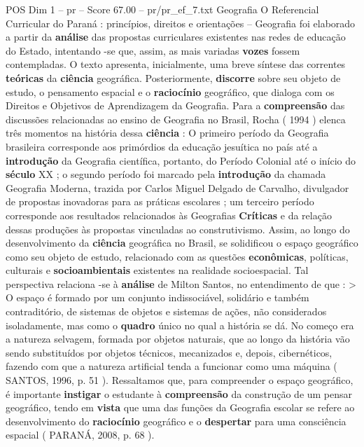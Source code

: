 \begin{textsample}{POS Dim 1 – pr – Score 67.00 – pr/pr\_ef\_7.txt}  \label{ex:f1_pos_028}
Geografia O Referencial Curricular do Paraná : princípios, direitos e orientações – Geografia foi elaborado a partir da \textbf{análise} das propostas curriculares existentes nas redes de educação do Estado, intentando -se que, assim, as mais variadas \textbf{vozes} fossem contempladas.
O texto apresenta, inicialmente, uma breve síntese das correntes \textbf{teóricas} da \textbf{ciência} geográfica.
Posteriormente, \textbf{discorre} sobre seu objeto de estudo, o pensamento espacial e o \textbf{raciocínio} geográfico, que dialoga com os Direitos e Objetivos de Aprendizagem da Geografia.
Para a \textbf{compreensão} das discussões relacionadas ao ensino de Geografia no Brasil, Rocha ( 1994 ) elenca três momentos na história dessa \textbf{ciência} : O primeiro período da Geografia brasileira corresponde aos primórdios da educação jesuítica no país até a \textbf{introdução} da Geografia científica, portanto, do Período Colonial até o início do \textbf{século} XX ; o segundo período foi marcado pela \textbf{introdução} da chamada Geografia Moderna, trazida por Carlos Miguel Delgado de Carvalho, divulgador de propostas inovadoras para as práticas escolares ; um terceiro período corresponde aos resultados relacionados às Geografias \textbf{Críticas} e da relação dessas produções às propostas vinculadas ao construtivismo.
Assim, ao longo do desenvolvimento da \textbf{ciência} geográfica no Brasil, se solidificou o espaço geográfico como seu objeto de estudo, relacionado com as questões \textbf{econômicas}, políticas, culturais e \textbf{socioambientais} existentes na realidade socioespacial.
Tal perspectiva relaciona -se à \textbf{análise} de Milton Santos, no entendimento de que : > O espaço é formado por um conjunto indissociável, solidário e também contraditório, de sistemas de objetos e sistemas de ações, não considerados isoladamente, mas como o \textbf{quadro} único no qual a história se dá.
No começo era a natureza selvagem, formada por objetos naturais, que ao longo da história vão sendo substituídos por objetos técnicos, mecanizados e, depois, cibernéticos, fazendo com que a natureza artificial tenda a funcionar como uma máquina ( SANTOS, 1996, p. 51 ).
Ressaltamos que, para compreender o espaço geográfico, é importante \textbf{instigar} o estudante à \textbf{compreensão} da construção de um pensar geográfico, tendo em \textbf{vista} que uma das funções da Geografia escolar se refere ao desenvolvimento do \textbf{raciocínio} geográfico e o \textbf{despertar} para uma consciência espacial ( PARANÁ, 2008, p. 68 ).

\end{textsample}
